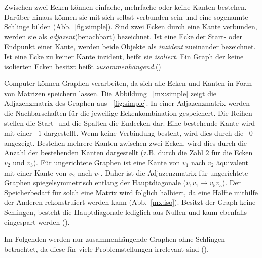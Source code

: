 Zwischen zwei Ecken können einfache, mehrfache oder keine Kanten bestehen.
Darüber hinaus können sie mit sich selbst verbunden sein und eine sogenannte Schlinge bilden (Abb.~\ref{fig:simple}).
Sind zwei Ecken durch eine Kante verbunden, werden sie als \textit{adjazent}(benachbart) bezeichnet.
Ist eine Ecke der Start- oder Endpunkt einer Kante, werden beide Objekte als \textit{inzident} zueinander bezeichnet.
Ist eine Ecke zu keiner Kante inzident, heißt sie \textit{isoliert}.
Ein Graph der keine isolierten Ecken besitzt heißt \textit{zusammenhängend}.(\cite[4\psq]{theory}) \par

Computer können Graphen verarbeiten, da sich alle Ecken und Kanten in Form von Matrizen speichern lassen.
Die Abbildung ~\ref{mx:simple} zeigt die Adjazenzmatrix des Graphen aus ~\ref{fig:simple}.
In einer Adjazenzmatrix werden die Nachbarschaften für die jeweilige Eckenkombination gespeichert.
Die Reihen stellen die Start- und die Spalten die Endecken dar.
Eine bestehende Kante wird mit einer ~$1$ dargestellt.
Wenn keine Verbindung besteht, wird dies durch die ~$0$ angezeigt.
Bestehen mehrere Kanten zwischen zwei Ecken, wird dies durch die Anzahl der bestehenden Kanten dargestellt (z.B. durch die Zahl $2$ für die Ecken $v_{2}$ und $v_{3}$).
Für ungerichtete Graphen ist eine Kante von $v_{1}$ nach $v_{2}$ äquivalent mit einer Kante von $v_{2}$ nach $v_{1}$.
Daher ist die Adjazenzmatrix für ungerichtete Graphen spiegelsymmetrisch entlang der Hauptdiagonale ($v_{1}v_{1} \rightarrow v_{5}v_{5}$).
Der Speicherbedarf für solch eine Matrix wird folglich halbiert, da eine Hälfte mithilfe der Anderen rekonstruiert werden kann (Abb.~\ref{mx:iso}).
Besitzt der Graph keine Schlingen, besteht die Hauptdiagonale lediglich aus Nullen und kann ebenfalls eingespart werden (\cite[19]{algorithms}).

Im Folgenden werden nur zusammenhängende Graphen ohne Schlingen betrachtet, da diese für viele Problemstellungen irrelevant sind (\cite[4\psq]{theory}).

